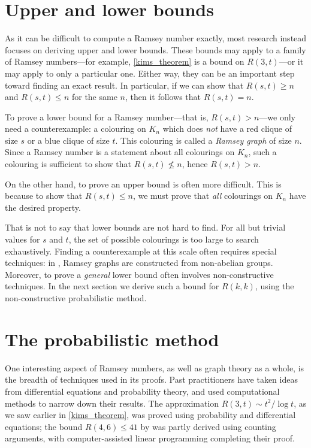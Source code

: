 \documentclass{article}
\begin{document}
\section{Upper and lower bounds}

As it can be difficult to compute a Ramsey number exactly, most research instead focuses on deriving upper and lower bounds. These bounds may apply to a family of Ramsey numbers---for example, \cref{kims_theorem} is a bound on $R(3,t)$---or it may apply to only a particular one. Either way, they can be an important step toward finding an exact result. In particular, if we can show that $R(s,t) \geq n$ and $R(s,t) \leq n$ for the same $n$, then it follows that $R(s,t) = n$.

To prove a lower bound for a Ramsey number---that is, $R(s,t) > n$---we only need a counterexample: a colouring on $K_n$ which does \emph{not} have a red clique of size $s$ or a blue clique of size $t$. This colouring is called a \textit{Ramsey graph} of size $n$. Since a Ramsey number is a statement about all colourings on $K_n$, such a colouring is sufficient to show that $R(s,t) \nleq n$, hence $R(s,t) > n$.

On the other hand, to prove an upper bound is often more difficult. This is because to show that $R(s,t) \leq n$, we must prove that \emph{all} colourings on $K_n$ have the desired property.

That is not to say that lower bounds are not hard to find. For all but trivial values for $s$ and $t$, the set of possible colourings is too large to search exhaustively. Finding a counterexample at this scale often requires special techniques: in \citet{exoo2004some}, Ramsey graphs are constructed from non-abelian groups. Moreover, to prove a \emph{general} lower bound often involves non-constructive techniques. In the next section we derive such a bound for $R(k,k)$, using the non-constructive probabilistic method.

\section{The probabilistic method}

\label{probabilistic_method}

One interesting aspect of Ramsey numbers, as well as graph theory as a whole, is the breadth of techniques used in its proofs. Past practitioners have taken ideas from differential equations and probability theory, and used computational methods to narrow down their results. The approximation $R(3,t) \sim t^2/\log t$, as we saw earlier in \cref{kims_theorem}, was proved using probability and differential equations; the bound $R(4,6) \leq 41$ by \citet{mckay1997subgraph} was partly derived using counting arguments, with computer-assisted linear programming completing their proof.
\end{document}
